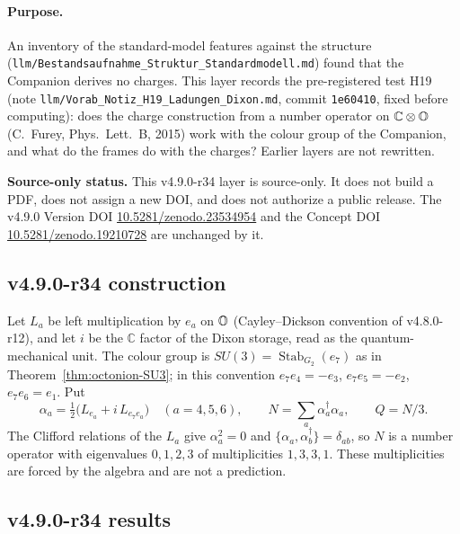 \paragraph{Purpose.}
An inventory of the standard-model features against the structure (\texttt{llm/Bestandsaufnahme\_Struktur\_Standardmodell.md})
found that the Companion derives no charges.  This layer records the pre-registered test H19 (note
\texttt{llm/Vorab\_Notiz\_H19\_Ladungen\_Dixon.md}, commit \texttt{1e60410}, fixed before computing): does the charge
construction from a number operator on \(\mathbb C\otimes\mathbb{O}\) (C.~Furey, Phys.\ Lett.\ B, 2015) work with the colour group
of the Companion, and what do the frames do with the charges?  Earlier layers are not rewritten.

\noindent\textbf{Source-only status.}
This v4.9.0-r34 layer is source-only.  It does not build a PDF, does not assign a new DOI,
and does not authorize a public release.  The v4.9.0 Version DOI
\href{https://doi.org/10.5281/zenodo.23534954}{10.5281/zenodo.23534954} and the Concept DOI
\href{https://doi.org/10.5281/zenodo.19210728}{10.5281/zenodo.19210728} are unchanged by it.

\subsection*{v4.9.0-r34 construction}
\label{subsec:v490-r34-construction}

Let \(L_a\) be left multiplication by \(e_a\) on \(\mathbb{O}\) (Cayley--Dickson convention of v4.8.0-r12), and let \(i\) be the
\(\mathbb C\) factor of the Dixon storage, read as the quantum-mechanical unit.  The colour group is
\(SU(3)=\operatorname{Stab}_{G_2}(e_7)\) as in Theorem~\ref{thm:octonion-SU3}; in this convention \(e_7e_4=-e_3\),
\(e_7e_5=-e_2\), \(e_7e_6=e_1\).  Put
\[
\alpha_a=\tfrac12\bigl(L_{e_a}+i\,L_{e_7e_a}\bigr)\quad(a=4,5,6),\qquad N=\sum_a\alpha_a^\dagger\alpha_a,\qquad Q=N/3 .
\]
The Clifford relations of the \(L_a\) give \(\alpha_a^2=0\) and \(\{\alpha_a,\alpha_b^\dagger\}=\delta_{ab}\), so \(N\) is a
number operator with eigenvalues \(0,1,2,3\) of multiplicities \(1,3,3,1\).  These multiplicities are forced by the algebra
and are not a prediction.

\subsection*{v4.9.0-r34 results}
\label{subsec:v490-r34-results}


